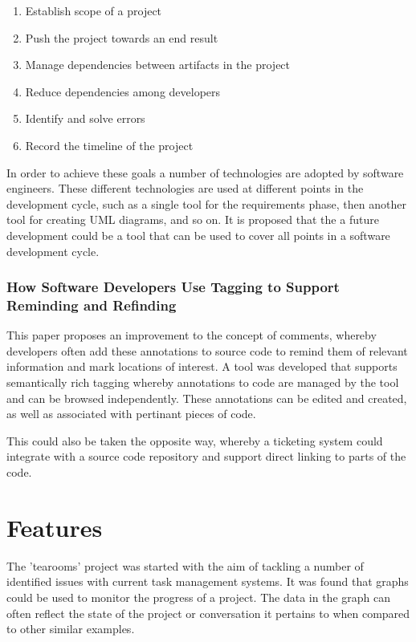 \documentclass{l4proj}
\begin{document}
\begin {enumerate}
\item Establish scope of a project
\item Push the project towards an end result
\item Manage dependencies between artifacts in the project
\item Reduce dependencies among developers
\item Identify and solve errors
\item Record the timeline of the project
\end {enumerate}

In order to achieve these goals a number of technologies are adopted by software engineers.  These different technologies are used at different points in the development cycle, such as a single tool for the requirements phase, then another tool for creating UML diagrams, and so on.  It is proposed that the a future development could be a tool that can be used to cover all points in a software development cycle.

\subsection {How Software Developers Use Tagging to Support Reminding and Refinding}

This paper proposes an improvement to the concept of comments, whereby developers often add these annotations to source code to remind them of relevant information and mark locations of interest.  A tool was developed that supports semantically rich tagging whereby annotations to code are managed by the tool and can be browsed independently.  These annotations can be edited and created, as well as associated with pertinant pieces of code.  

This could also be taken the opposite way, whereby a ticketing system could integrate with a source code repository and support direct linking to parts of the code.


\chapter{Features}

The 'tearooms' project was started with the aim of tackling a number of identified issues with current task management systems. It was found that graphs could be used to monitor the progress of a project. The data in the graph can often reflect the state of the project or conversation it pertains to when compared to other similar examples.
\end{document}
